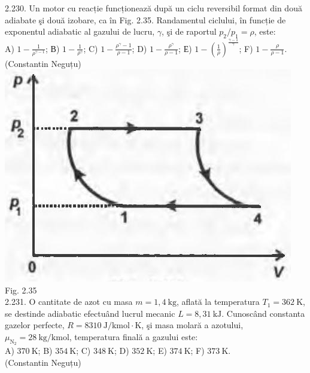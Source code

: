 \documentclass[10pt]{article}
\begin{document}
2.230. Un motor cu reacție funcționează după un ciclu reversibil format din două adiabate şi două izobare, ca în Fig. 2.35. Randamentul ciclului, în funcție de exponentul adiabatic al gazului de lucru, $\gamma$, şi de raportul $p_{2} / p_{1}=\rho$, este:\\ A) $1-\frac{1}{\rho^{\gamma-1}}$; В) $1-\frac{1}{\rho^{\gamma}}$; C) $1-\frac{\rho^{\gamma}-1}{\rho-1}$; D) $1-\frac{\rho^{\gamma}}{\rho-1}$; Е) $1-\left(\frac{1}{\rho}\right)^{\frac{\gamma-1}{\gamma}}$; F) $1-\frac{\rho}{\rho-1}$.\\ (Constantin Neguțu)\\ \includegraphics[max width=\textwidth, center]{2025_07_01_5b3ff9fa0d508c8e9f17g-125} Fig. 2.35\\

2.231. O cantitate de azot cu masa $m=1,4 \mathrm{~kg}$, aflată la temperatura $T_{1}=362 \mathrm{~K}$, se destinde adiabatic efectuând lucrul mecanic $L=8,31 \mathrm{~kJ}$. Cunoscând constanta gazelor perfecte, $R=8310 \mathrm{~J} / \mathrm{kmol} \cdot \mathrm{K}$, şi masa molară a azotului, $\mu_{\mathrm{N}_{2}}=28 \mathrm{~kg} / \mathrm{kmol}$, temperatura finală a gazului este:\\ A) $370 \mathrm{~K}$; B) $354 \mathrm{~K}$; C) $348 \mathrm{~K}$; D) $352 \mathrm{~K}$; E) $374 \mathrm{~K}$; F) $373 \mathrm{~K}$.\\ (Constantin Neguțu)\\
\end{document}
